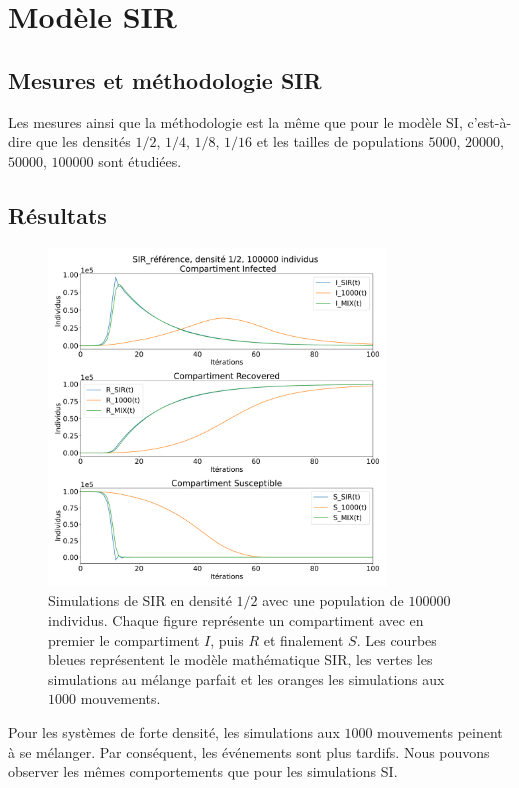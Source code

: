 \chapter{Modèle SIR} \label{ch:SIR}

\section{Mesures et méthodologie SIR}

Les mesures ainsi que la méthodologie est la même que pour le modèle SI, c'est-à-dire que les densités $1/2$, $1/4$, $1/8$, $1/16$ et les tailles de populations $5000$, $20000$, $50000$, $100000$ sont étudiées.

\section{Résultats}

\begin{figure}[h]
	\centering
	\captionsetup{justification=centering}
	\includegraphics[width=0.8\textwidth]{Images/SIR_ref_2_100.pdf}
	\caption[Simulation SIR, densité $1/2$]{Simulations de SIR en densité $1/2$ avec une population de $100000$ individus. Chaque figure représente un compartiment avec en premier le compartiment $I$, puis $R$ et finalement $S$. Les courbes bleues représentent le modèle mathématique SIR, les vertes les simulations au mélange parfait et les oranges les simulations aux $1000$ mouvements.}
\end{figure}

Pour les systèmes de forte densité, les simulations aux $1000$ mouvements peinent à se mélanger. Par conséquent, les événements sont plus tardifs. Nous pouvons observer les mêmes comportements que pour les simulations SI.

